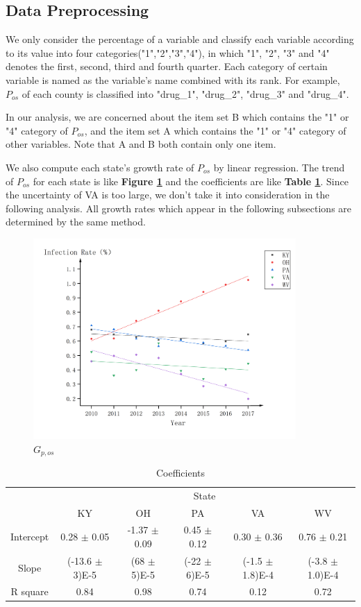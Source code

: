 \documentclass[12pt]{article}
\begin{document}
\subsection{Data Preprocessing}
We only consider the percentage of a variable and classify each variable according to its value into four categories("1","2","3","4"), in which "1", "2", "3" and "4" denotes the first, second, third and fourth quarter. Each category of certain variable is named as the variable's name combined with its rank. For example, $P_{os}$ of each county is classified into "drug\_1", "drug\_2", "drug\_3" and "drug\_4".

In our analysis, we are concerned about the item set B which contains the "1" or "4" category of $P_{os}$, and the item set A which contains the "1" or "4" category of other variables. Note that A and B both contain only one item.

We also compute each state's growth rate of $P_{os}$ by linear regression. The trend of $P_{os}$ for each state is like \textbf{Figure \ref{rate}} and the coefficients are like \textbf{Table \ref{coef}}. Since the uncertainty of VA is too large, we don't take it into consideration in the following analysis. All growth rates which appear in the following subsections are determined by the same method. 
 
\begin{figure}[h]
\centering
\includegraphics[width=10cm]{plots/rate.png}
\caption{$G_{p,os}$}
\label{rate}
\end{figure}

\begin{table}[h]
\centering
\begin{tabular}{cccccc}
  \toprule
   & \multicolumn{5}{c}{State} \\
  \cmidrule{2-6}
& KY & OH & PA & VA & WV  \\
  \midrule
  Intercept & 0.28 $\pm$ 0.05 & -1.37 $\pm$ 0.09 & 0.45 $\pm$ 0.12 & 0.30 $\pm$ 0.36 & 0.76 $\pm$ 0.21  \\
  Slope & (-13.6 $\pm$ 3)E-5 & (68 $\pm$ 5)E-5 & (-22 $\pm$ 6)E-5 & (-1.5 $\pm$ 1.8)E-4 & (-3.8 $\pm$ 1.0)E-4  \\
  R square & 0.84 & 0.98 & 0.74 & 0.12 & 0.72  \\
  \bottomrule
\end{tabular}
\caption{Coefficients}
\label{coef}
\end{table}
\end{document}

